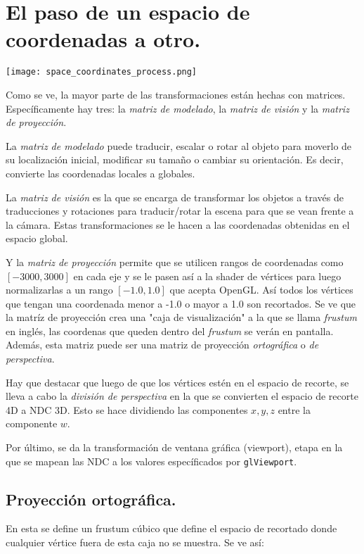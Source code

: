 \section{El paso de un espacio de coordenadas a otro.}
\texttt{[image: space\_coordinates\_process.png]}

Como se ve, la mayor parte de las transformaciones están hechas con matrices.
Específicamente hay tres: la \emph{matriz de modelado}, la \emph{matriz de visión} y la \emph{matriz de proyección}.

La \emph{matriz de modelado} puede traducir, escalar o rotar al objeto para moverlo de su localización inicial, modificar su tamaño o cambiar su orientación. Es decir, convierte las coordenadas locales a globales.

La \emph{matriz de visión} es la que se encarga de transformar los objetos a través de traducciones y rotaciones para traducir/rotar la escena para que se vean frente a la cámara. Estas transformaciones se le hacen a las coordenadas obtenidas en el espacio global.

Y la \emph{matriz de proyección} permite que se utilicen rangos de coordenadas como $[-3000, 3000]$ en cada eje y se le pasen así a la shader de vértices para luego normalizarlas a un rango $[-1.0, 1.0]$ que acepta OpenGL. Así todos los vértices que tengan una coordenada menor a -1.0 o mayor a 1.0 son recortados. Se ve que la matríz de proyección crea una "caja de visualización" a la que se llama \emph{frustum} en inglés, las coordenas que queden dentro del \emph{frustum} se verán en pantalla. Además, esta matriz puede ser una matriz de proyección \emph{ortográfica} o \emph{de perspectiva}.

Hay que destacar que luego de que los vértices estén en el espacio de recorte, se lleva a cabo la \emph{división de perspectiva} en la que se convierten el espacio de recorte 4D a NDC 3D. Esto se hace dividiendo las componentes $x, y, z$ entre la componente $w$.

Por último, se da la transformación de ventana gráfica (viewport), etapa en la que se mapean las NDC a los valores específicados por \lstinline{glViewport}.

\subsection{Proyección ortográfica.}
En esta se define un frustum cúbico que define el espacio de recortado donde cualquier vértice fuera de esta caja no se muestra. Se ve así:

